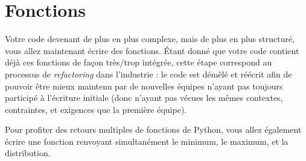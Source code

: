 \documentclass[11pt,a4paper]{article}
\begin{document}


\newpage %
\section{Fonctions}

\bigskip

Votre code devenant de plus en plus complexe, mais de plus en plus structuré, vous allez maintenant écrire des fonctions.
\'Etant donné que votre code contient déjà ces fonctions de façon très/trop intégrée, cette étape correspond au processus de \textit{refactoring} dans l'industrie : le code est démêlé et réécrit afin de pouvoir être mieux maintenu par de nouvelles équipes n'ayant pas toujours participé à l'écriture initiale (donc n'ayant pas vécues les mêmes contextes, contraintes, et exigences que la première équipe).

\medskip





\bigskip

Pour profiter des retours multiples de fonctions de Python, vous allez également écrire une fonction renvoyant simultanément le minimum, le maximum, et la distribution.

\bigskip


\end{document}
